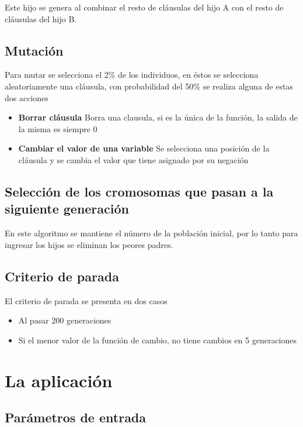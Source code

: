 \documentclass[a4paper]{article}
\begin{document}
Este hijo se genera al combinar el resto de cláusulas del hijo A con el resto de cláusulas del hijo B.

\subsection{Mutación}

Para mutar se selecciona el 2\% de los individuos, en éstos se selecciona aleatoriamente una cláusula, con probabilidad del 50\% se realiza alguna de estas dos acciones

\begin{itemize}
	\item \textbf{Borrar cláusula} Borra una clausula, si es la única de la función, la salida de la misma es siempre 0
	\item \textbf{Cambiar el valor de una variable} Se selecciona una posición de la cláusula y se cambia el valor que tiene asignado por su negación
\end{itemize}

\subsection{Selección de los cromosomas que pasan a la siguiente generación}

En este algoritmo se mantiene el número de la población inicial, por lo tanto para ingresar los hijos se eliminan los peores padres.

\subsection{Criterio de parada}

El criterio de parada se presenta en dos casos

\begin{itemize}
	\item Al pasar 200 generaciones
	\item Si el menor valor de la función de cambio, no tiene cambios en 5 generaciones
\end{itemize}

\section{La aplicación}

\subsection{Parámetros de entrada}
\end{document}
